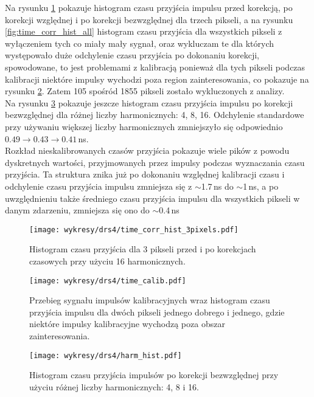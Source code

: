 \documentclass[a4paper,11pt,twoside]{article}
\begin{document}
Na rysunku \ref{fig:time_corr_hist3} pokazuje histogram czasu przyjścia impulsu przed korekcją, po korekcji względnej i po korekcji bezwzględnej dla trzech pikseli, a na rysunku \ref{fig:time_corr_hist_all} histogram czasu przyjścia dla wszystkich pikseli z wyłączeniem tych co miały mały sygnał, oraz wykluczam te dla których występowało duże odchylenie czasu przyjścia po dokonaniu korekcji, spowodowane, to jest problemami z kalibracją ponieważ dla tych pikseli podczas kalibracji niektóre impulsy wychodzi poza region zainteresowania, co pokazuje na rysunku \ref{fig:time_calib}. Zatem 105 spośród 1855 pikseli zostało wykluczonych z analizy.  \\
Na rysunku \ref{fig:hist_harm} pokazuje jeszcze histogram czasu przyjścia impulsu po korekcji bezwzględnej dla różnej liczby harmonicznych: 4, 8, 16. Odchylenie standardowe przy używaniu większej liczby harmonicznych zmniejszyło się odpowiednio $0.49 \rightarrow 0.43 \rightarrow 0.41$\,ns. \\
Rozkład nieskalibrowanych czasów przyjścia pokazuje wiele pików z powodu dyskretnych wartości, przyjmowanych przez impulsy podczas wyznaczania czasu przyjścia. Ta struktura  znika już po dokonaniu  względnej kalibracji czasu i odchylenie czasu przyjścia impulsu zmniejsza się z $\sim$1.7\,ns do $\sim$1\,ns, a po uwzględnieniu także średniego czasu przyjścia impulsu dla wszystkich pikseli w danym zdarzeniu, zmniejsza się ono do $\sim$0.4\,ns

\begin{figure}[H] 
\centering
\texttt{[image: wykresy/drs4/time\_corr\_hist\_3pixels.pdf]}
\caption{Histogram czasu przyjścia dla 3 pikseli przed i po korekcjach czasowych przy użyciu 16 harmonicznych.}
\label{fig:time_corr_hist3}
\end{figure}

\begin{figure}[H] 
\centering
\texttt{[image: wykresy/drs4/time\_calib.pdf]}
\caption{Przebieg sygnału impulsów kalibracyjnych wraz histogram czasu przyjścia impulsu dla dwóch pikseli jednego dobrego i jednego, gdzie niektóre impulsy kalibracyjne wychodzą poza obszar zainteresowania.}
\label{fig:time_calib}
\end{figure}

\begin{figure}[H] 
\centering
\texttt{[image: wykresy/drs4/harm\_hist.pdf]}
\caption{Histogram czasu przyjścia impulsów po korekcji bezwzględnej przy użyciu różnej liczby harmonicznych: 4, 8 i 16.}
\label{fig:hist_harm}
\end{figure}
\end{document}
